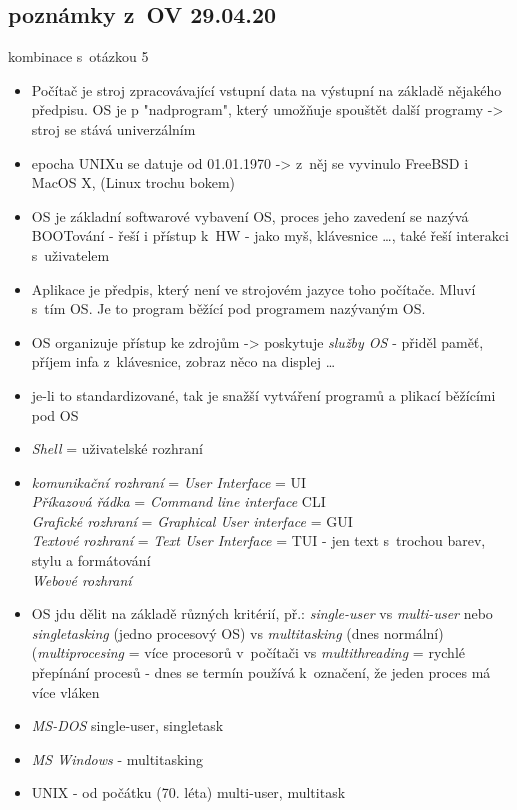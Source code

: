 \documentclass[12pt]{article}
\begin{document}
\subsection{poznámky z~OV 29.04.20}
\label{sec:OV_OS}
kombinace s~otázkou 5
\begin{itemize}
\item Počítač je stroj zpracovávající vstupní data na výstupní na základě nějakého předpisu. OS je p "nadprogram", který umožňuje spouštět další programy -> stroj se stává univerzálním
\item epocha UNIXu se datuje od 01.01.1970 -> z~něj se vyvinulo FreeBSD i MacOS X, (Linux trochu bokem)
\item OS je základní softwarové vybavení OS, proces jeho zavedení se nazývá BOOTování
 - řeší i přístup k~HW - jako myš, klávesnice \dots , také řeší interakci s~uživatelem
\item Aplikace je předpis, který není ve strojovém jazyce toho počítače. Mluví s~tím OS. Je to program běžící pod programem nazývaným OS.
\item OS organizuje přístup ke zdrojům -> poskytuje \emph{služby OS} - přiděl paměť, příjem infa z~klávesnice, zobraz něco na displej \dots
\item je-li to standardizované, tak je snažší vytváření programů a plikací běžícími pod OS
\item \emph{Shell} = uživatelské rozhraní
\item \emph{komunikační rozhraní } = \emph{User Interface} = UI \\
\emph{Příkazová řádka} = \emph{Command line interface} CLI\\
\emph{Grafické rozhraní} = \emph{Graphical User interface}  = GUI\\
\emph{Textové rozhraní} = \emph{Text User Interface} = TUI - jen text s~trochou barev, stylu a formátování\\
\emph{Webové rozhraní}
\item OS jdu dělit na základě různých kritérií, př.: \emph{single-user} vs \emph{multi-user} nebo \emph{singletasking} (jedno procesový OS) vs \emph{multitasking} (dnes normální) (\emph{multiprocesing} = více procesorů v~počítači vs \emph{multithreading} = rychlé přepínání procesů - dnes se termín používá k~označení, že jeden proces má více vláken
\item \emph{MS-DOS} single-user, singletask
\item \emph{MS Windows} - multitasking
\item UNIX - od počátku (70. léta) multi-user, multitask

\end{itemize}
\end{document}
